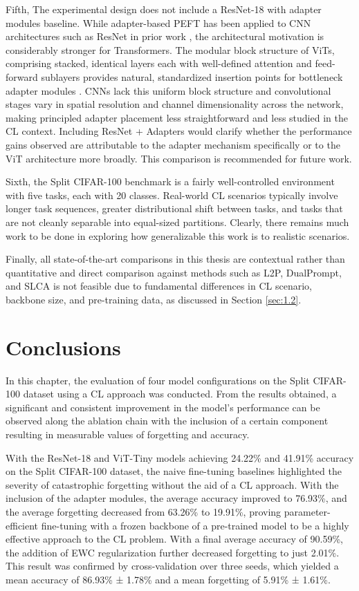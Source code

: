 \documentclass[english, LaM, oneside]{sapthesis}%
\numberwithin{equation}{chapter}
\begin{document}
Fifth, The experimental design does not include a ResNet-18 with adapter modules baseline. While adapter-based PEFT has been applied to CNN architectures such as ResNet in prior work \cite{15}\cite{rebuffi}, the architectural motivation is considerably stronger for Transformers. The modular block structure of ViTs, comprising stacked, identical layers each with well-defined attention and feed-forward sublayers provides natural, standardized insertion points for bottleneck adapter modules \cite{15} \cite{32}. CNNs lack this uniform block structure and convolutional stages vary in spatial resolution and channel dimensionality across the network, making principled adapter placement less straightforward and less studied in the CL context\cite{rebuffi}. Including ResNet + Adapters would clarify whether the performance gains observed are attributable to the adapter mechanism specifically or to the ViT architecture more broadly. This comparison is recommended for future work.

Sixth, the Split CIFAR-100 benchmark is a fairly well-controlled environment with five tasks, each with 20 classes. Real-world CL scenarios typically involve longer task sequences, greater distributional shift between tasks, and tasks that are not cleanly separable into equal-sized partitions.  Clearly, there remains much work to be done in exploring how generalizable this work is to realistic scenarios.

Finally, all state-of-the-art comparisons in this thesis are contextual rather than quantitative and direct comparison against methods such as L2P\cite{5}, DualPrompt\cite{41}, and SLCA\cite{slca} is not feasible due to fundamental differences in CL scenario, backbone size, and pre-training data, as discussed in Section \ref{sec:1.2}.
\section{Conclusions}
\label{sec:5.6}
In this chapter, the evaluation of four model configurations on the Split CIFAR-100 dataset using a CL approach was conducted. From the results obtained, a significant and consistent improvement in the model’s performance can be observed along the ablation chain with the inclusion of a certain component resulting in measurable values of forgetting and accuracy.

With the ResNet-18 and ViT-Tiny models achieving 24.22\% and 41.91\% accuracy on the Split CIFAR-100 dataset, the naive fine-tuning baselines highlighted the severity of catastrophic forgetting without the aid of a CL approach. With the inclusion of the adapter modules, the average accuracy improved to 76.93\%, and the average forgetting decreased from 63.26\% to 19.91\%, proving parameter-efficient fine-tuning with a frozen backbone of a pre-trained model to be a highly effective approach to the CL problem. With a final average accuracy of 90.59\%, the addition of EWC regularization further decreased forgetting to just 2.01\%. This result was confirmed by cross-validation over three seeds, which yielded a mean accuracy of 86.93\% ± 1.78\% and a mean forgetting of 5.91\% ± 1.61\%.
\end{document}
